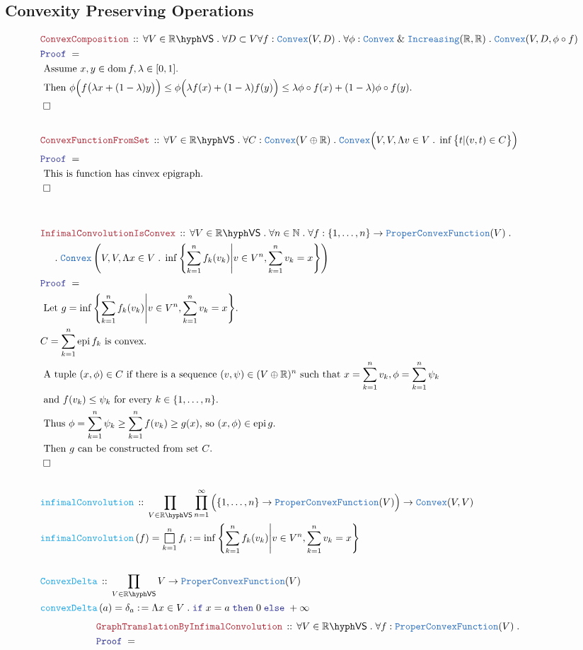 \documentclass[12pt]{scrartcl}
\newcommand{\TYPE}[1]{\textcolor{NavyBlue}{\mathtt{#1}}}
\newcommand{\FUNC}[1]{\textcolor{Cerulean}{\mathtt{#1}}}
\newcommand{\LOGIC}[1]{\textcolor{Blue}{\mathtt{#1}}}
\newcommand{\THM}[1]{\textcolor{Maroon}{\mathtt{#1}}}
\renewcommand{\.}{\; . \;}
\newcommand{\de}{: \kern 0.1pc =}
\newcommand{\If}{\LOGIC{if} \;}
\newcommand{\Then}{ \; \LOGIC{then} \;}
\newcommand{\Else}{\; \LOGIC{else} \;}
\newcommand{\Act}[1]{\left( #1 \right)}
\newcommand{\Theorem}[2]{& \THM{#1} \, :: \, #2 \\ & \Proof = \\ }
\newcommand{\DeclareFunc}[2]{& \FUNC{#1} \, :: \, #2 \\}
\newcommand{\DefineNamedFunc}[4]{&  \FUNC{#1}\Act{#2} = #3 \de #4 \\}
\newcommand{\NewLine}{\\ & \kern 1pc}
\newcommand{\Page}[1]{ \begin{align*} #1 \end{align*}   }
\renewcommand{\And}{\; \& \;}
\newcommand{\Reals}{\mathbb{R} }
\newcommand{\Nat}{\mathbb{N} }
\newcommand{\QED}{\; \square}
\newcommand{\EndProof}{& \QED \\}
\newcommand{\Proof}{\LOGIC{Proof} \; }
\newcommand{\Explain}[1]{& \text{#1.} \\}
\newcommand{\ExplainFurther}[1]{& \text{#1} \\}
\DeclareMathOperator*{\dom}{dom}
\newcommand{\VS}[1]{#1\hyph\mathsf{VS}} %
\newcommand{\Convex}{\TYPE{Convex}}
\newcommand{\PCF}{\TYPE{ProperConvexFunction}}
\DeclareMathOperator{\epi}{epi}
\DeclareMathOperator*{\bigsquare}{\scalerel*{\square}{\textstyle\sum}}
\begin{document}
\subsection{Convexity Preserving Operations}
\Page{
	\Theorem{ConvexComposition}
	{
		\forall V \in \VS{\Reals} \.
		\forall D \subset V
		\forall f : \Convex(V,D) \.
		\forall \phi : \Convex \And \TYPE{Increasing}(\Reals,\Reals) \.
		\Convex(V,D,\phi \circ f)
	}
	\Explain{ Assume $x,y \in \dom f, \lambda \in [0,1]$}
	\Explain{
		Then $\phi\Big( f\big( \lambda x + (1-\lambda) y \big)\Big) \le \phi\Big( \lambda f(x) + (1-\lambda) f(y)\Big)
		\le \lambda \phi \circ f(x) + (1-\lambda) \phi \circ f(y)$}
	\EndProof
	\\
	\Theorem{ConvexFunctionFromSet}
	{
		\forall V \in \VS{\Reals} \.
		\forall C : \Convex(V \oplus \Reals) \.
		\Convex\Big(V,V, \Lambda v \in V \. \inf \big\{t|(v,t)\in C \big\}\Big)
	}
	\Explain{
	This is function has cinvex epigraph}
	\EndProof	
	\\
	\\
	\Theorem{InfimalConvolutionIsConvex}
	{
		\forall V \in \VS{\Reals} \.
		\forall n \in \Nat \.
		\forall f : \{1,\ldots,n\} \to \PCF(V) \. \NewLine \.
		\Convex\left( V, V, \Lambda x \in V \. \inf \left\{ \sum^n_{k=1} f_k(v_k) \Bigg| v \in V^n, 
			\sum^n_{k=1} v_k = x \right\} \right)
	}
	\Explain{
		Let $g = \inf \left\{ \sum^n_{k=1} f_k(v_k) \Bigg| v \in V^n, 
			\sum^n_{k=1} v_k = x \right\}$}
	\Explain{$C = \sum^n_{k=1} \epi f_k$ is convex}
	\ExplainFurther{ 
		A tuple $(x,\phi) \in C$ if there is a sequence $(v,\psi) \in (V\oplus\Reals)^n$
		such that $x = \sum^n_{k=1} v_k,\phi = \sum^n_{k=1} \psi_k$}
	\Explain{		
		 and 
		$f(v_k) \le \psi_k$ for every $k \in \{1,\ldots,n\}$}
	\Explain{
		Thus $\phi = \sum^n_{k=1} \psi_k \ge \sum^n_{k=1} f(v_k) \ge  g(x)$,
		so $(x,\phi) \in \epi g$}
	\Explain{ Then $g$ can be constructed from set $C$}
	\EndProof
	\\
	\DeclareFunc{infimalConvolution}{\prod_{V \in \VS{\Reals}} \prod^\infty_{n=1} 
		\Big(\{1,\ldots,n\} \to \PCF(V) \Big) \to \Convex(V,V)  }
	\DefineNamedFunc{infimalConvolution}{f}{\bigsquare^n_{k=1} f_i}
	{
		\inf \left\{ \sum^n_{k=1} f_k(v_k) \Bigg| v \in V^n, \sum^n_{k=1} v_k = x \right\} 
	}
	\\
	\DeclareFunc{ConvexDelta}{\prod_{V \in \VS{\Reals}}  V \to \PCF(V)  }
	\DefineNamedFunc{convexDelta}{a}{\delta_a}
	{
		\Lambda x \in V \. \If x = a \Then 0 \Else +\infty 
	}
}\Page{
	\Theorem{GraphTranslationByInfimalConvolution}
	{		
		\forall V \in \VS{\Reals} \.
		\forall f : \PCF(V) \.		
}}
\end{document}
